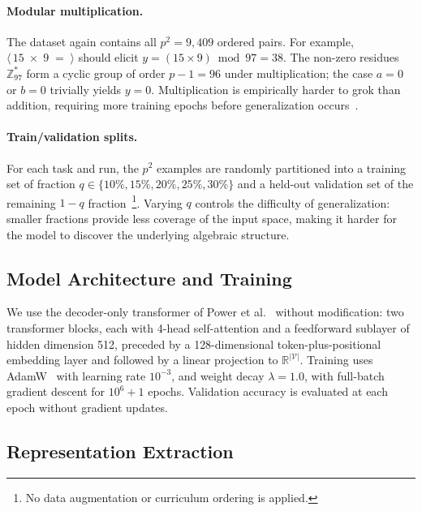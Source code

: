 \paragraph{Modular multiplication.}
The dataset again contains all $p^2 = 9{,}409$ ordered pairs. For
example, $\langle\,15\;\times\;9\;=\;\rangle$ should elicit
$y = (15 \times 9) \bmod 97 = 38$. The non-zero residues
$\mathbb{Z}_{97}^*$ form a cyclic group of order $p-1 = 96$ under
multiplication; the case $a = 0$ or $b = 0$ trivially yields $y = 0$.
Multiplication is empirically harder to grok than addition, requiring
more training epochs before generalization occurs~\cite{GrokkingOpenAI}.

\paragraph{Train/validation splits.}
For each task and run, the $p^2$ examples are randomly partitioned into
a training set of fraction $q \in \{10\%, 15\%, 20\%, 25\%, 30\%\}$
and a held-out validation set of the remaining $1-q$ fraction~\footnote{No data augmentation or curriculum
ordering is applied.}. Varying $q$ controls the difficulty of
generalization: smaller fractions provide less coverage of the input
space, making it harder for the model to discover the underlying
algebraic structure. 

\subsection{Model Architecture and Training}
\label{subsec:model}

We use the decoder-only transformer of Power et al.~\cite{GrokkingOpenAI}
without modification: two transformer blocks, each with 4-head
self-attention and a feedforward sublayer of hidden dimension 512,
preceded by a 128-dimensional token-plus-positional embedding layer and
followed by a linear projection to $\mathbb{R}^{|\mathcal{V}|}$.
%
Training uses AdamW~\cite{loshchilov2018decoupled} with learning rate
$10^{-3}$, and weight decay
$\lambda = 1.0$, with full-batch gradient descent for $10^6 + 1$ epochs.
Validation accuracy is evaluated at each epoch without gradient updates.

\subsection{Representation Extraction}
\label{subsec:extraction}

